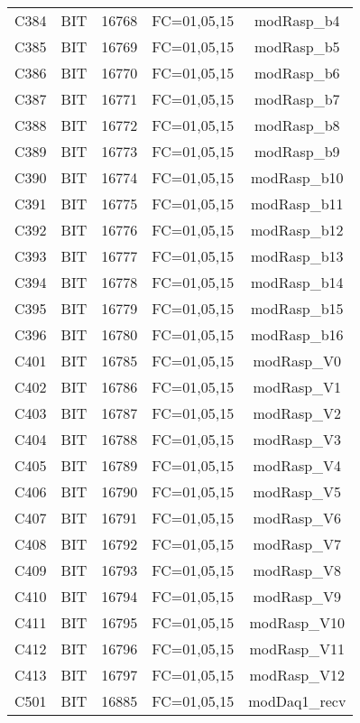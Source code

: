 \begin{center}
\begin{longtable}[c]{ |c|c|c|c|c| }
        C384	&	BIT	&	16768	&	FC=01,05,15	&	modRasp\_b4\\
        C385	&	BIT	&	16769	&	FC=01,05,15	&	modRasp\_b5\\
        C386	&	BIT	&	16770	&	FC=01,05,15	&	modRasp\_b6\\
        C387	&	BIT	&	16771	&	FC=01,05,15	&	modRasp\_b7\\
        C388	&	BIT	&	16772	&	FC=01,05,15	&	modRasp\_b8\\
        C389	&	BIT	&	16773	&	FC=01,05,15	&	modRasp\_b9\\
        C390	&	BIT	&	16774	&	FC=01,05,15	&	modRasp\_b10\\
        C391	&	BIT	&	16775	&	FC=01,05,15	&	modRasp\_b11\\
        C392	&	BIT	&	16776	&	FC=01,05,15	&	modRasp\_b12\\
        C393	&	BIT	&	16777	&	FC=01,05,15	&	modRasp\_b13\\
        C394	&	BIT	&	16778	&	FC=01,05,15	&	modRasp\_b14\\
        C395	&	BIT	&	16779	&	FC=01,05,15	&	modRasp\_b15\\
        C396	&	BIT	&	16780	&	FC=01,05,15	&	modRasp\_b16\\
        C401	&	BIT	&	16785	&	FC=01,05,15	&	modRasp\_V0\\
        C402	&	BIT	&	16786	&	FC=01,05,15	&	modRasp\_V1\\
        C403	&	BIT	&	16787	&	FC=01,05,15	&	modRasp\_V2\\
        C404	&	BIT	&	16788	&	FC=01,05,15	&	modRasp\_V3\\
        C405	&	BIT	&	16789	&	FC=01,05,15	&	modRasp\_V4\\
        C406	&	BIT	&	16790	&	FC=01,05,15	&	modRasp\_V5\\
        C407	&	BIT	&	16791	&	FC=01,05,15	&	modRasp\_V6\\
        C408	&	BIT	&	16792	&	FC=01,05,15	&	modRasp\_V7\\
        C409	&	BIT	&	16793	&	FC=01,05,15	&	modRasp\_V8\\
        C410	&	BIT	&	16794	&	FC=01,05,15	&	modRasp\_V9\\
        C411	&	BIT	&	16795	&	FC=01,05,15	&	modRasp\_V10\\
        C412	&	BIT	&	16796	&	FC=01,05,15	&	modRasp\_V11\\
        C413	&	BIT	&	16797	&	FC=01,05,15	&	modRasp\_V12\\
        C501	&	BIT	&	16885	&	FC=01,05,15	&	modDaq1\_recv\\

\end{longtable}
\end{center}
